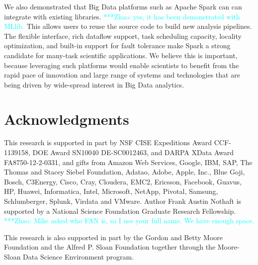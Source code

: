 \documentclass[conference]{IEEEtran}
\newcommand{\zhaonote}[1]{{\textcolor{cyan}    { ***Zhao:      #1 }}}
\newcommand{\zhaonote}[1]{}
\begin{document}
We also demonstrated that Big Data platforms such as Apache Spark can can integrate with existing libraries.
\zhaonote{yes, it has been demonstrated with MLlib.}
This allows users to reuse the source code to build new analysis pipelines.
The flexible interface, rich dataflow support, task scheduling capacity, locality optimization, and built-in support for fault tolerance make Spark a 
strong candidate for many-task scientific applications. 
We believe this is important, because leveraging such platforms would enable scientists to benefit from the rapid pace of innovation and large range of systems and technologies that are being driven by wide-spread interest in Big Data analytics.

\section{Acknowledgments}

This research is supported in part by NSF CISE Expeditions Award CCF-1139158, DOE Award SN10040 DE-SC0012463, and DARPA XData Award FA8750-12-2-0331, and gifts from Amazon Web Services, Google, IBM, SAP, The Thomas and Stacey Siebel Foundation, Adatao, Adobe, Apple, Inc., Blue Goji, Bosch, C3Energy, Cisco, Cray, Cloudera, EMC2, Ericsson, Facebook, Guavus, HP, Huawei, Informatica, Intel, Microsoft, NetApp, Pivotal, Samsung, Schlumberger, Splunk, Virdata and VMware. Author Frank Austin Nothaft is supported by a National Science Foundation Graduate Research Fellowship.
\zhaonote{Mike asked who FAN is, so I use your full name. We have enough space.}

This research is also supported in part by the Gordon and Betty Moore
Foundation and the Alfred P. Sloan Foundation together through the
Moore-Sloan Data Science Environment program.
%

%
%




\end{document}

